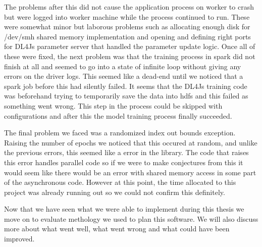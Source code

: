 The problems after this did not cause the application process on worker to crash but were logged into worker machine while the process continued to run.
These were somewhat minor but laborous problems such as allocating enough disk for /dev/smh shared memory implementation and opening and defining right ports for DL4Js parameter server that handled the parameter update logic.
Once all of these were fixed, the next problem was that the training process in spark did not finish at all and seemed to go into a state of infinite loop without giving any errors on the driver logs.
This seemed like a dead-end until we noticed that a spark job before this had silently failed.
It seems that the DL4Js training code was beforehand trying to temporarily save the data into hdfs and this failed as something went wrong.
This step in the process could be skipped with configurations and after this the model training process finally succeeded.

The final problem we faced was a randomized index out bounds exception.
Raising the number of epochs we noticed that this occured at random, and unlike the previous errors, this seemed like a error in the library.
The code that raises this error handles parallel code so if we were to make conjectures from this it would seem like there would be an error with shared memory access in some part of the asynchronous code.
However at this point, the time allocated to this project was already running out so we could not confirm this definitely.

Now that we have seen what we were able to implement during this thesis we move on to evaluate methology we used to plan this software.
We will also discuss more about what went well, what went wrong and what could have been improved.